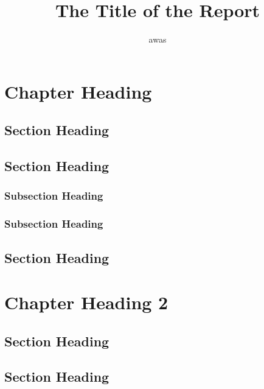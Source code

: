 \documentclass{aaltoseries}
\author{awas}
\title{The Title of the Report}
\begin{document}
\draftabstract{\lipsum[1-3]}

\begin{preface}%
\lipsum[1-4]
\end{preface}

\tableofcontents

\chapter{Chapter Heading}
\section{Section Heading}
\lipsum[1-4]
\section{Section Heading}
\lipsum[5-6]
\subsection{Subsection Heading}
\lipsum[7-8]
\subsection{Subsection Heading}
\lipsum[9-10]
\section{Section Heading}
\lipsum[11-12]


\chapter{Chapter Heading 2}
\section{Section Heading}
\lipsum[1-4]
\section{Section Heading}
\lipsum[5-6]
\end{document}
